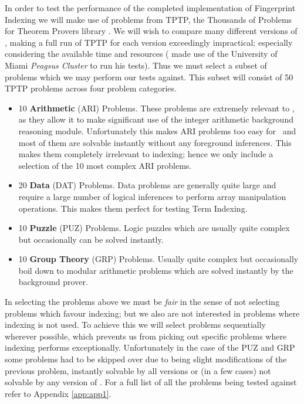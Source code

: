 In order to test the performance of the completed implementation of Fingerprint Indexing
we will make use of problems from TPTP, the Thousands of Problems for Theorem Provers
library \cite{tptp}.
We will wish to compare many different versions of \beagle, making a full run of TPTP
for each version
exceedingly impractical; especially considering the available time and resources (
made use of the University of Miami \emph{Peagsus Cluster} to run his tests). Thus
we must select a subset of problems which we may perform our tests against.
This subset will consist of 50 TPTP problems across four problem categories.
\begin{itemize}
\item 10 \textbf{Arithmetic} (ARI) Problems. These problems are extremely relevant
to \beagle, as they allow it to make significant use of the integer arithmetic
background reasoning module. Unfortunately this makes ARI problems too easy for \beagle\ 
and most of them are solvable instantly without any foreground inferences. This makes
them completely irrelevant to indexing; hence we only include a selection of the 10 most complex ARI problems. 
\item 20 \textbf{Data} (DAT) Problems. Data problems are generally quite large and
require a large number of logical inferences to perform array manipulation operations.
This makes them perfect for testing Term Indexing.
\item 10 \textbf{Puzzle} (PUZ) Problems. Logic puzzles which are usually quite
complex but occasionally can be solved instantly.
\item 10 \textbf{Group Theory} (GRP) Problems. Usually quite complex but occasionally
boil down to modular arithmetic problems which are solved instantly by the background prover.
\end{itemize}
In selecting the problems above we must be \emph{fair} in the sense of not selecting
problems which favour indexing; but we also are not interested in problems where
indexing is not used. To achieve this we will select problems sequentially wherever
possible, which prevents us from picking out specific problems where indexing
performs exceptionally. Unfortunately in the case of the PUZ and GRP some problems had
to be skipped over due to being slight modifications of the previous problem, instantly solvable by all versions
or (in a few cases) not solvable by any version of \beagle. For a full
list of all the problems being tested against refer to Appendix \ref{app:app1}.

